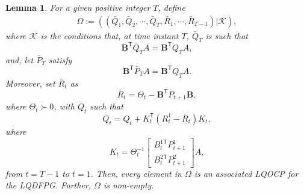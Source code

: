 \documentclass[letterpaper, 10 pt, conference]{ieeeconf}  %
\newcommand{\transpose}{\mathsf{T}}
\newtheorem{lemma}{Lemma}
\begin{document}
\begin{lemma}
    \cite[Theorem 5]{prasad_structure_2023}
    For a given positive integer $T$, define
    \begin{align*}
        \Omega := ((\bar{Q}_{1},\bar{Q}_{2},\cdots,\bar{Q}_{T},\bar{R}_{1},\cdots,\bar{R}_{T-1})|\mathcal{K}),
    \end{align*}
    where $\mathcal{K}$ is the conditions that, at time instant $T$, $\bar{Q}_{T}$ is such that
        \begin{equation}
            \mathbf{B}^{\transpose}\bar{Q}_{T}A = \mathbf{B}^{\transpose}Q_{T}A,
        \end{equation}
        and, let $\bar{P}_{T}$ satisfy
        \begin{equation}
            \mathbf{B}^{\transpose}\bar{P}_{T}A = \mathbf{B}^{\transpose}Q_{T}A.
        \end{equation}
        Moreover, set $\bar{R}_{t}$ as
        \begin{equation}\label{eq:matrixR}
            \bar{R}_{t} = \Theta_{t} - \mathbf{B}^{\transpose}\bar{P}_{t+1}\mathbf{B},
        \end{equation}
        where $\Theta_{t} \succ 0$,
        with $\bar{Q}_{t}$ such that
        \begin{equation}
            \bar{Q}_{t} = Q_{t} + K_{t}^{\transpose}(R_{t}^{1}-\bar{R}_{t})K_{t},
        \end{equation}
        where
        \begin{equation}
            K_{t} = \Theta_{t}^{-1}
            \begin{bmatrix}
                B_{t}^{1\transpose}P_{t+1}^{1}\\
                B_{t}^{2\transpose}P_{t+1}^{2}
            \end{bmatrix}
            A,
        \end{equation}
        from $t=T-1$ to $t=1$.
    Then, every element in $\Omega$ is an associated LQOCP for the LQDFPG. Further, $\Omega$ is non-empty.
\end{lemma}
\end{document}
